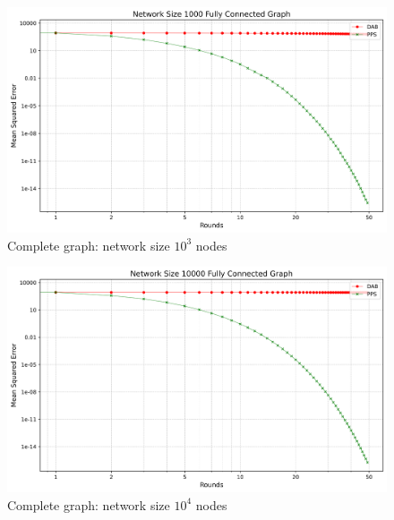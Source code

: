 \begin{figure}[H]
    \centering
    \includegraphics[scale=0.5]{figures/completeGraphSimulations/DAB_vs_PPS_FCG_r50_n1000.png}
    \caption{Complete graph: network size $10^{3}$ nodes}
    \label{fig:1000CompleteGraph}
\end{figure}
\begin{figure}[H]
    \centering
    \includegraphics[scale=0.5]{figures/completeGraphSimulations/DAB_vs_PPS_FCG_r50_n10000.png}
    \caption{Complete graph: network size $10^{4}$ nodes}
    \label{fig:10000CompleteGraph}
\end{figure}

